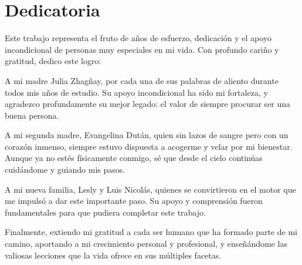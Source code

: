 \chapter*{Dedicatoria}

Este trabajo representa el fruto de años de esfuerzo, dedicación y el apoyo incondicional de personas muy especiales en mi vida. Con profundo cariño y gratitud, dedico este logro:

A mi madre Julia Zhagñay, por cada una de sus palabras de aliento durante todos mis años de estudio. Su apoyo incondicional ha sido mi fortaleza, y agradezco profundamente su mejor legado: el valor de siempre procurar ser una buena persona.

A mi segunda madre, Evangelina Dután, quien sin lazos de sangre pero con un corazón inmenso, siempre estuvo dispuesta a acogerme y velar por mi bienestar. Aunque ya no estés físicamente conmigo, sé que desde el cielo continúas cuidándome y guiando mis pasos.

A mi nueva familia, Lesly y Luis Nicolás, quienes se convirtieron en el motor que me impulsó a dar este importante paso. Su apoyo y comprensión fueron fundamentales para que pudiera completar este trabajo.

Finalmente, extiendo mi gratitud a cada ser humano que ha formado parte de mi camino, aportando a mi crecimiento personal y profesional, y enseñándome las valiosas lecciones que la vida ofrece en sus múltiples facetas.